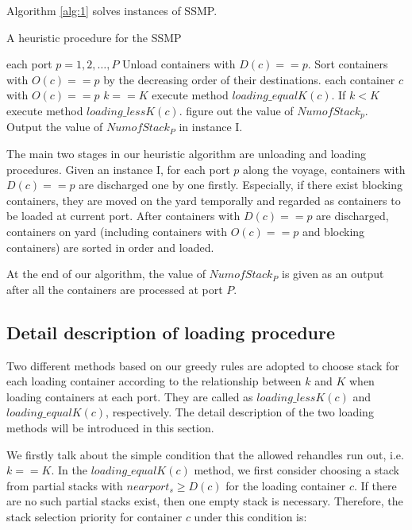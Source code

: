 \documentclass[review,3p,times,authoryear,12pt]{elsarticle}
\begin{document}
Algorithm \ref{alg:1} solves instances of SSMP.

\begin{algorithm}[htbp]
  \caption{A heuristic procedure for the SSMP}
  \label{alg:1}
  \begin{codebox}

    \li \For each port $p=1, 2 , \ldots,P $
    \li \Do
                Unload containers with $D(c)==p$.
    \li         Sort containers with $O(c)==p$ by the decreasing order of their destinations.
    \li         \For each container $c$ with $O(c)==p$
    \li         \Do
                   \If $k==K$
    \li            \Then
                        execute method $loading\_equalK(c)$.
    \li            \Else If $k < K$
    \li                 execute method $loading\_lessK(c)$.
                   \End
                \End
    \li          figure out the value of $NumofStack_p$.
        \End
    \li Output the value of $NumofStack_P$ in instance I.

 \end{codebox}
 \end{algorithm}

The main two stages in our heuristic algorithm are unloading and loading procedures.
Given an instance I, for each port $p$ along the voyage, containers with $D(c)==p$ are discharged one by one firstly.
Especially, if there exist blocking containers, they are moved on the yard temporally and regarded as containers to be loaded at current port.
After containers with $D(c)==p$ are discharged, containers on yard (including containers with $O(c)==p$ and blocking containers) are sorted in order and loaded.

At the end of our algorithm, the value of $NumofStack_P$ is given as an output after all the containers are processed at port $P$.

\subsection{Detail description of loading procedure}
\label{sec:d2}

Two different methods based on our greedy rules are adopted to choose stack for each loading container according to the relationship between $k$ and $K$ when loading containers at each port.
They are called as $loading\_lessK(c)$ and $loading\_equalK(c)$, respectively.
The detail description of the two loading methods will be introduced in this section.

We firstly talk about the simple condition that the allowed rehandles run out, i.e. $k==K$.
In the $loading\_equalK(c)$ method, we first consider choosing a stack from partial stacks with $nearport_s \ge D(c)$ for the loading container $c$.
If there are no such partial stacks exist, then one empty stack is necessary.
Therefore, the stack selection priority for container $c$ under this condition is:
\end{document}
